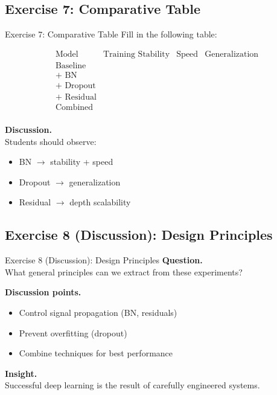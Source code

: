 \documentclass[aspectratio=169,11pt]{beamer}
\begin{document}
\subsection{Exercise 7: Comparative Table}
\begin{frame}[t,allowframebreaks]{Exercise 7: Comparative Table}
\small
Fill in the following table:

\[
\begin{array}{c|c|c|c}
\text{Model} & \text{Training Stability} & \text{Speed} & \text{Generalization} \\
\hline
\text{Baseline} & & & \\
\text{+ BN} & & & \\
\text{+ Dropout} & & & \\
\text{+ Residual} & & & \\
\text{Combined} & & & \\
\end{array}
\]

\textbf{Discussion.}\\ Students should observe:

\begin{itemize}
    \item BN $\rightarrow$ stability + speed
    \item Dropout $\rightarrow$ generalization
    \item Residual $\rightarrow$ depth scalability
\end{itemize}
\end{frame}

\subsection{Exercise 8 (Discussion): Design Principles}
\begin{frame}[t,allowframebreaks]{Exercise 8 (Discussion): Design Principles}
\small
\textbf{Question.}\\ What general principles can we extract from these experiments?

\textbf{Discussion points.}\\ \begin{itemize}
    \item Control signal propagation (BN, residuals)
    \item Prevent overfitting (dropout)
    \item Combine techniques for best performance
\end{itemize}

\textbf{Insight.}\\ Successful deep learning is the result of carefully engineered systems.
\end{frame}
\end{document}
